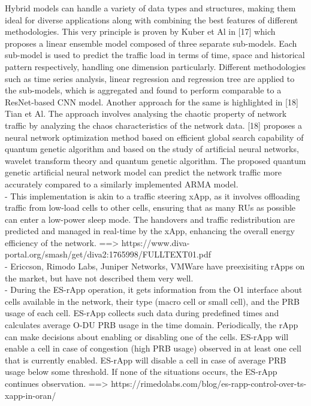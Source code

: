 \documentclass[conference]{IEEEtran}
\begin{document}
Hybrid models can handle a variety of data types and structures, making them ideal for diverse applications along with combining the best features of different methodologies. This very principle is proven by Kuber et Al in [17] which proposes a linear ensemble model composed of three separate sub-models. Each sub-model is used to predict the traffic load in terms of time, space and historical pattern respectively, handling one dimension particularly. Different methodologies such as time series analysis, linear regression and regression tree are applied to the sub-models, which is aggregated and found to perform comparable to a ResNet-based CNN model. Another approach for the same is highlighted in [18] Tian et Al. The approach involves analysing the chaotic property of network traffic by analyzing the chaos characteristics of the network data. [18] proposes a neural network optimization method based on efficient global search capability of quantum genetic algorithm and based on the study of artificial neural networks, wavelet transform theory and quantum genetic algorithm. The proposed quantum genetic artificial neural network model can predict the network traffic more accurately compared to a similarly implemented ARMA model.\\

- This implementation is akin to a traffic steering xApp, as it involves offloading traffic from low-load cells to other cells, ensuring that as many RUs as possible can enter a low-power sleep mode. The handovers and traffic redistribution are predicted and managed in real-time by the xApp, enhancing the overall energy efficiency of the network. ==> https://www.diva-portal.org/smash/get/diva2:1765998/FULLTEXT01.pdf \\

- Ericcson, Rimodo Labs, Juniper Networks, VMWare have preexisiting rApps on the market, but have not described them very well. \\

- During the ES-rApp operation, it gets information from the O1 interface about cells available in the network, their type (macro cell or small cell), and the PRB usage of each cell. ES-rApp collects such data during predefined times and calculates average O-DU PRB usage in the time domain. Periodically, the rApp can make decisions about enabling or disabling one of the cells. ES-rApp will enable a cell in case of congestion (high PRB usage) observed in at least one cell that is currently enabled. ES-rApp will disable a cell in case of average PRB usage below some threshold. If none of the situations occurs, the ES-rApp continues observation. ==> https://rimedolabs.com/blog/es-rapp-control-over-ts-xapp-in-oran/ \\
\end{document}
